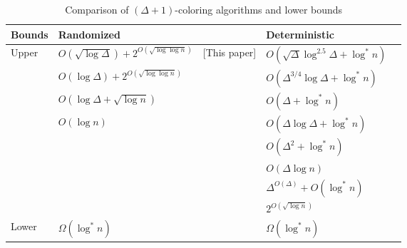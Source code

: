 \documentclass[11pt]{amsart}
\begin{document}
\begin{table*}
\centering
\begin{tabular}{|l | l r |l r | }    \hline
   Bounds  & Randomized & & Deterministic &\\ \hline
    \multirow{ 8}{*}{Upper} & $O(\sqrt{\log \Delta})+2^{O(\sqrt{\log \log n})}$ & [This paper]  & $O(\sqrt{\Delta}\log^{2.5}\Delta + \log^{*} n)$ & \cite{FraigniaudHK15}  \\ \cline{2-5}&$O(\log \Delta)+2^{O(\sqrt{\log \log n})}$ & \cite{BEPS16} & $O(\Delta^{3/4}\log \Delta+ \log^* n)$ & \cite{bar15a}  \\ \cline{2-5}&$O(\log \Delta+\sqrt{\log n})$  &\cite{Sch10}  &  $O(\Delta+ \log^* n)$ & \cite{BEK09}  \\ \cline{2-5}&$O(\log n)$ & \cite{lub86,alon86,Joh99} &   $O(\Delta\log \Delta + \log^* n)$ & \cite{Kuhn2006On} \\ \cline{2-5}& & & $O(\Delta^2 + \log^{*} n)$ & \cite{linial92, GPS88} \\ \cline{4-5}
    & & & $O(\Delta \log n)$ & \cite{GPS88} \\ \cline{4-5}& & & $\Delta^{O(\Delta)} + O(\log^{*} n)$  & \cite{GP87} \\ \cline{4-5}& $ $ &    & $2^{O(\sqrt{\log n})}$ & \cite{panc92}   \\ \hline
    \hline
    Lower& $\Omega(\log^{*} n)$ & \cite{Noar91} & $\Omega(\log^{*} n)$ & \cite{linial92}   \\ \hline
  \end{tabular}
\caption{Comparison of $(\Delta +1)$-coloring algorithms and lower bounds} \label{ResultsOverview}
\vspace{-5mm}
\end{table*}
\end{document}
